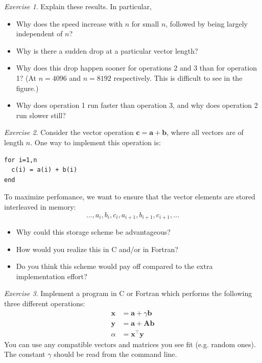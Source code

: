 \documentclass[onecolumn, oneside, a4paper, 11pt]{memoir}
\theoremstyle{remark}
\newtheorem{ex}{Exercise}
\begin{document}
\begin{ex}
  Explain these results. In particular,
  \begin{itemize}
  \item Why does the speed increase with $n$ for small $n$, followed by being
    largely independent of $n$?
  \item Why is there a sudden drop at a particular vector length?
  \item Why does this drop happen sooner for operations 2 and 3 than for
    operation 1? (At $n=4096$ and $n=8192$ respectively. This is difficult to
    see in the figure.)
  \item Why does operation 1 run faster than operation 3, and why does operation
    2 run slower still?
  \end{itemize}
\end{ex}

\begin{ex}
  Consider the vector operation $\bm c = \bm a + \bm b$, where all vectors are
  of length $n$. One way to implement this operation is:
  \begin{lstlisting}[style=fortran]
for i=1,n
  c(i) = a(i) + b(i)
end
  \end{lstlisting}
  To maximize perfomance, we want to ensure that the vector elements are stored
  interleaved in memory:
  \[
    \ldots, a_i, b_i, c_i, a_{i+1}, b_{i+1}, c_{i+1}, \ldots
  \]
  \begin{itemize}
  \item Why could this storage scheme be advantageous?
  \item How would you realize this in C and/or in Fortran?
  \item Do you think this scheme would pay off compared to the extra
    implementation effort?
  \end{itemize}
\end{ex}

\begin{ex}
  Implement a program in C or Fortran which performs the following three
  different operations:
  \begin{align*}
    \bm x &= \bm a + \gamma \bm b \\
    \bm y &= \bm a + \bm A \bm b \\
    \alpha &= \bm x^\intercal \bm y
  \end{align*}
  You can use any compatible vectors and matrices you see fit (e.g. random
  ones). The constant $\gamma$ should be read from the command line.
\end{ex}
\end{document}
